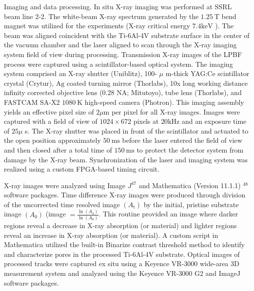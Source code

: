 \documentclass[10pt]{article}
\begin{document}
Imaging and data processing. In situ X-ray imaging was performed at SSRL beam line 2-2. The white-beam X-ray spectrum generated by the $1.25 \mathrm{~T}$ bend magnet was utilized for the experiments (X-ray critical energy $7.4 \mathrm{keV}$ ). The beam was aligned coincident with the Ti-6Al-4V substrate surface in the center of the vacuum chamber and the laser aligned to scan through the X-ray imaging system field of view during processing. Transmission X-ray images of the LPBF process were captured using a scintillator-based optical system. The imaging system comprised an X-ray shutter (Uniblitz), 100- $\mu$ m-thick YAG:Ce scintillator crystal (Crytur), $\mathrm{Ag}$ coated turning mirror (Thorlabs), 10x long working distance infinity corrected objective lens (0.28 NA; Mitutoyo), tube lens (Thorlabs), and FASTCAM SA-X2 $1080 \mathrm{~K}$ high-speed camera (Photron). This imaging assembly yields an effective pixel size of $2 \mu \mathrm{m}$ per pixel for all X-ray images. Images were captured with a field of view of $1024 \times 672$ pixels at $20 \mathrm{kHz}$ and an exposure time of $25 \mu$ s. The X-ray shutter was placed in front of the scintillator and actuated to the open position approximately $50 \mathrm{~ms}$ before the laser entered the field of view and then closed after a total time of $150 \mathrm{~ms}$ to protect the detector system from damage by the X-ray beam. Synchronization of the laser and imaging system was realized using a custom FPGA-based timing circuit.

X-ray images were analyzed using Image $J^{47}$ and Mathematica (Version 11.1.1) ${ }^{48}$ software packages. Time difference X-ray images were produced through division of the uncorrected time resolved image $\left(A_{\mathrm{t}}\right)$ by the initial, pristine substrate image $\left(A_{0}\right)$ (image $=\frac{\ln \left(A_{4}\right)}{\ln \left(A_{0}\right)}$. This routine provided an image where darker regions reveal a decrease in X-ray absorption (or material) and lighter regions reveal an increase in X-ray absorption (or material). A custom script in Mathematica utilized the built-in Binarize contrast threshold method to identify and characterize pores in the processed Ti-6Al-4V substrate. Optical images of processed tracks were captured ex situ using a Keyence VR-3000 wide-area 3D measurement system and analyzed using the Keyence VR-3000 G2 and ImageJ software packages.
\end{document}
